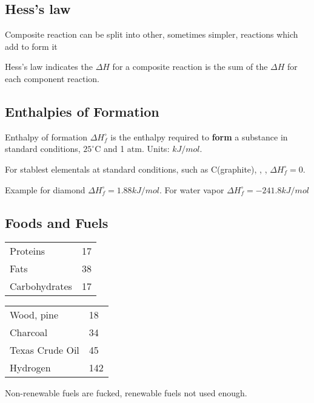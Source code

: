 \begin{mdframed}\begin{multicols}{2}\subsection{Hess's law}
\begin{compactdesc}
\item[Composite reaction] can be split into other, sometimes simpler, reactions
    which add to form it
\item[Hess's law] indicates the $\Delta H$ for a composite reaction is the sum
    of the $\Delta H$ for each component reaction.
\end{compactdesc}

\subsection{Enthalpies of Formation}
\begin{compactdesc}
    \item[Enthalpy of formation] $\Delta H_f^\circ$ is the enthalpy required
        to \textbf{form} a substance in standard conditions, $25^\circ$C and 1
        atm. Units: $kJ/mol$.
    \item[For stablest elementals] at standard conditions, such as
        C(graphite), , , $\Delta H_f^\circ = 0$.
    \item[Example] for diamond  $\Delta H_f^\circ = 1.88 kJ/mol$.
        For water vapor $\Delta H_f^\circ = -241.8 kJ/mol$
\end{compactdesc}
\end{multicols}\end{mdframed}


\begin{mdframed}
\subsection{Foods and Fuels}
\begin{multicols}{2}
\begin{tabular}{ll}
Proteins& 17
    \\
Fats& 38
    \\
Carbohydrates& 17
    \\
\end{tabular}

\begin{tabular}{ll}
Wood, pine& 18
    \\
Charcoal& 34
    \\
Texas Crude Oil& 45
    \\
Hydrogen& 142
    \\
\end{tabular}
\end{multicols}
Non-renewable fuels are fucked, renewable fuels not used enough.
\end{mdframed}



